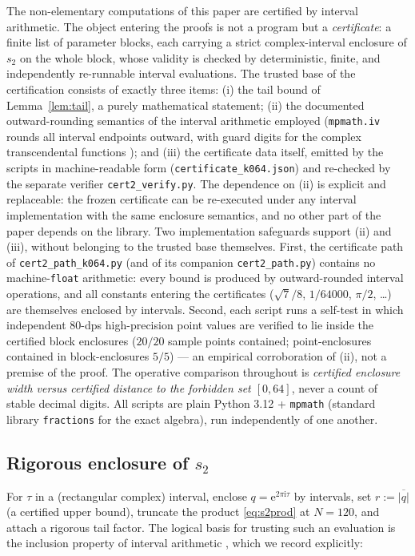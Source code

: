\documentclass[11pt]{article}
\theoremstyle{definition}
\theoremstyle{remark}
\newcommand{\ii}{\mathrm{i}}
\newcommand{\e}{\mathrm{e}}
\begin{document}
The non-elementary computations of this paper are certified by interval
arithmetic. The object entering the proofs is not a program but a
\emph{certificate}: a finite list of parameter blocks, each carrying a
strict complex-interval enclosure of $s_2$ on the whole block, whose
validity is checked by deterministic, finite, and independently
re-runnable interval evaluations. The trusted base of the certification
consists of exactly three items: (i) the tail bound of
Lemma~\ref{lem:tail}, a purely mathematical statement; (ii) the
documented outward-rounding semantics of the interval arithmetic employed
(\texttt{mpmath.iv} rounds all interval endpoints outward, with guard
digits for the complex transcendental functions
\cite{mpmath,ivdoc}); and (iii) the certificate data itself, emitted by
the scripts in machine-readable form (\texttt{certificate\_k064.json})
and re-checked by the separate verifier \texttt{cert2\_verify.py}. The
dependence on (ii) is explicit and replaceable: the frozen certificate
can be re-executed under any interval implementation with the same
enclosure semantics, and no other part of the paper depends on the
library. Two implementation safeguards
support (ii) and (iii), without belonging to the trusted base themselves.
First, the certificate path of \texttt{cert2\_path\_k064.py} (and of its
companion \texttt{cert2\_path.py}) contains no machine-\texttt{float}
arithmetic: every bound is produced by outward-rounded interval
operations, and all constants entering the certificates ($\sqrt7/8$,
$1/64000$, $\pi/2$, \ldots) are themselves enclosed by intervals. Second,
each script runs a self-test in which independent $80$-dps high-precision
point values are verified to lie inside the certified block enclosures
($20/20$ sample points contained; point-enclosures contained in
block-enclosures $5/5$) --- an empirical corroboration of (ii), not a
premise of the proof. The operative comparison throughout is
\emph{certified enclosure width versus certified distance to the
forbidden set $[0,64]$}, never a count of stable decimal digits. All
scripts are plain Python 3.12 + \texttt{mpmath} \cite{mpmath} (standard
library \texttt{fractions} for the exact algebra), run independently of
one another.

\subsection{Rigorous enclosure of \texorpdfstring{$s_2$}{s2}}

For $\tau$ in a (rectangular complex) interval, enclose
$q=\e^{2\pi \ii\tau}$ by intervals, set $r:=\overline{|q|}$ (a certified
upper bound), truncate the product \eqref{eq:s2prod} at $N=120$, and attach
a rigorous tail factor. The logical basis for trusting such an evaluation
is the inclusion property of interval arithmetic \cite{MoKC}, which we
record explicitly:
\end{document}
